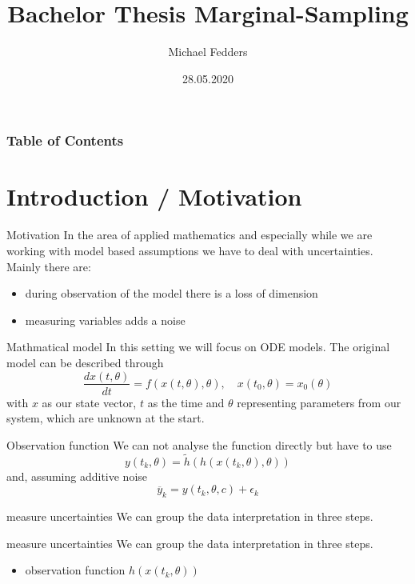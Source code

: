 \documentclass{beamer}
\title{Bachelor Thesis Marginal-Sampling}
\date{28.05.2020}
\author{Michael Fedders}
\begin{document}
	\maketitle
  	\begin{frame}[plain]
		\frametitle{Table of Contents}
		\tableofcontents
	\end{frame}
	
\section{Introduction / Motivation}

  	\begin{frame}{Motivation}
	  	In the area of applied mathematics and especially while we are working
	  	with model based assumptions we have to deal with uncertainties. Mainly
	  	there are:
	  	\begin{itemize}
	  		\item during observation of the model there is a \alert{loss} of 
	  		dimension
	  		\item measuring variables adds a \alert{noise}
	  	\end{itemize}
	\end{frame}
  
  	\begin{frame}{Mathmatical model}
     	In this setting we will focus on ODE models. The original model can be described
     	through
     	\[
     		\frac{dx(t,\theta)}{dt} = f(x(t,\theta),\theta), \quad x(t_0,\theta) = 			x_0(\theta)
     	\]
     	with $x$ as our state vector, $t$ as the time and $\theta$ representing
     	parameters from our system, which are unknown at the start.
	\end{frame}
	
	\begin{frame}{Observation function}
  		We can not analyse the function directly but have to use
		\[
			y(t_k,\theta) = \tilde{h}(h(x(t_k,\theta),\theta))
		\]
		and, assuming additive noise
		\[
			\overline{y}_{k} = y(t_k,\theta,c) + \epsilon_{k}
		\]
	\end{frame}
	
	
  	\begin{frame}{measure uncertainties}
    	We can group the data interpretation in three steps.      	
  	\end{frame}
  	
  	\begin{frame}{measure uncertainties}
    	We can group the data interpretation in three steps.
  		\begin{itemize}
   			\item observation function $h(x(t_k,\theta))$
    	\end{itemize}
  	\end{frame}
  	
\end{document}

